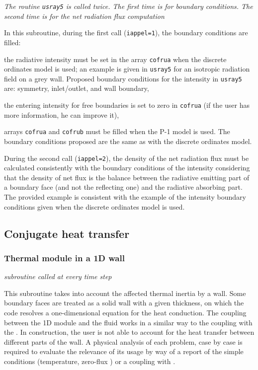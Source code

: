 {{\noindent
\textit{The routine \texttt{usray5} is called twice. The first time is for boundary
conditions. The second time is for the net radiation flux computation}

In this subroutine, during the first call (\texttt{iappel=1}), the boundary conditions
 are filled:
\begin{list}{-}{}
\item the radiative intensity must be set in the array \texttt{cofrua} when the discrete
 ordinates model is used; an example is given in \texttt{usray5} for an isotropic radiation
 field on a grey wall. Proposed boundary conditions for the intensity in \texttt{usray5} are:
symmetry, inlet/outlet, and wall boundary,
\item the entering intensity for free boundaries is set to zero in \texttt{cofrua} (if the
user has more information, he can improve it),
\item arrays \texttt{cofrua} and \texttt{cofrub} must be filled when the P-1 model is
 used. The boundary conditions proposed are the same as with the discrete ordinates model.
\end{list}
During the second call (\texttt{iappel=2}), the density of the net radiation flux must be
 calculated consistently with the boundary conditions of the intensity considering that the
density of net flux is the balance between the radiative emitting part of a boundary face
(and not the reflecting one) and the radiative absorbing part. The provided example is
consistent with the example of the intensity boundary conditions given when the discrete
 ordinates model is used.


\subsection{Conjugate heat transfer}
\subsubsection{Thermal module in a 1D wall}

\noindent
\textit{subroutine called at every time step}

This subroutine takes into account the affected thermal inertia by a wall.
 Some boundary faces are treated as a solid wall with a given thickness, on
 which the code resolves a one-dimensional equation for the heat conduction.
 The coupling between the 1D module and the fluid works in a similar way to
 the coupling with the \syrthes. In construction, the user is not able to
 account for the heat transfer between different parts of the wall. A physical
 analysis of each problem, case by case is required to evaluate the relevance
 of its usage by way of a report of the simple conditions (temperature, zero-flux
 ) or a coupling with \syrthes.\\

}}
